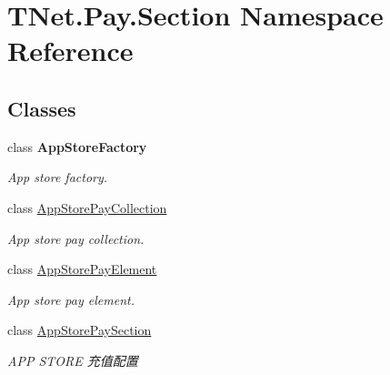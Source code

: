 \hypertarget{namespace_t_net_1_1_pay_1_1_section}{}\section{T\+Net.\+Pay.\+Section Namespace Reference}
\label{namespace_t_net_1_1_pay_1_1_section}
\subsection*{Classes}
\begin{DoxyCompactItemize}
\item 
class {\bfseries App\+Store\+Factory}
\begin{DoxyCompactList}\small\item\em App store factory. \end{DoxyCompactList}\item 
class \mbox{\hyperlink{class_t_net_1_1_pay_1_1_section_1_1_app_store_pay_collection}{App\+Store\+Pay\+Collection}}
\begin{DoxyCompactList}\small\item\em App store pay collection. \end{DoxyCompactList}\item 
class \mbox{\hyperlink{class_t_net_1_1_pay_1_1_section_1_1_app_store_pay_element}{App\+Store\+Pay\+Element}}
\begin{DoxyCompactList}\small\item\em App store pay element. \end{DoxyCompactList}\item 
class \mbox{\hyperlink{class_t_net_1_1_pay_1_1_section_1_1_app_store_pay_section}{App\+Store\+Pay\+Section}}
\begin{DoxyCompactList}\small\item\em A\+PP S\+T\+O\+RE 充值配置 \end{DoxyCompactList}\end{DoxyCompactItemize}
